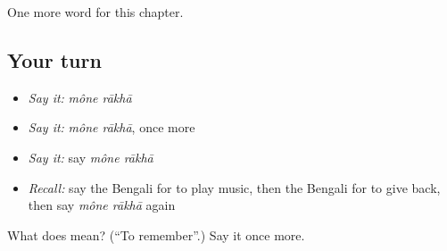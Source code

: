 \begin{grammarlens}[title={What you've built}]
One more word for this chapter.
\end{grammarlens}

\subsection*{Your turn}
\begin{itemize}
\raggedright
  \item \emph{Say it:} \emph{mône rākhā}
  \item \emph{Say it:} \emph{mône rākhā}, once more
  \item \emph{Say it:} say \emph{mône rākhā}
  \item \emph{Recall:} say the Bengali for to play music, then the Bengali for to give back, then say \emph{mône rākhā} again
\end{itemize}

\begin{tcolorbox}[breakable,colback=teal!4,colframe=teal!35!black,title={Before you move on}]
What does   mean? (\textquotedblleft{}To remember\textquotedblright{}.) Say it once more.
\end{tcolorbox}
